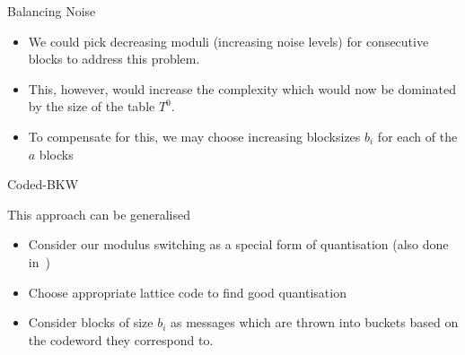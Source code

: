\documentclass[10pt,compress]{beamer}
\begin{document}
\begin{frame}{Balancing Noise}

  \begin{itemize}
  \item We could \alert{pick decreasing moduli} (increasing noise levels) for consecutive blocks to address this problem.
  \item This, however, would increase the complexity which would now be dominated by the size of the table $T^{0}$.
  \item To compensate for this, we may \alert{choose increasing blocksizes} $b_i$ for each of the $a$ blocks
  \end{itemize}


\end{frame}

\begin{frame}{Coded-BKW}

  This approach can be generalised
  \begin{itemize}
  \item Consider our modulus switching as a special form of quantisation (also done in~\cite{C:KirFou15})
  \item Choose appropriate \alert{lattice code} to find good quantisation
  \item Consider blocks of size $b_i$ as messages which are thrown into buckets based on the codeword they correspond to.
  \end{itemize}


  \framebreak{}

  \centering

\end{frame}
\end{document}
